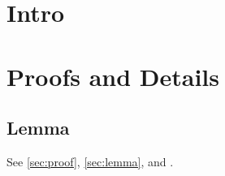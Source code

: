 \section{Intro}
\appendices
\section[Proof Notes]{Proofs and Details}\label{sec:proof}
\subsection{Lemma}\label{sec:lemma}
See \autoref{sec:proof}, \autoref{sec:lemma}, and .
